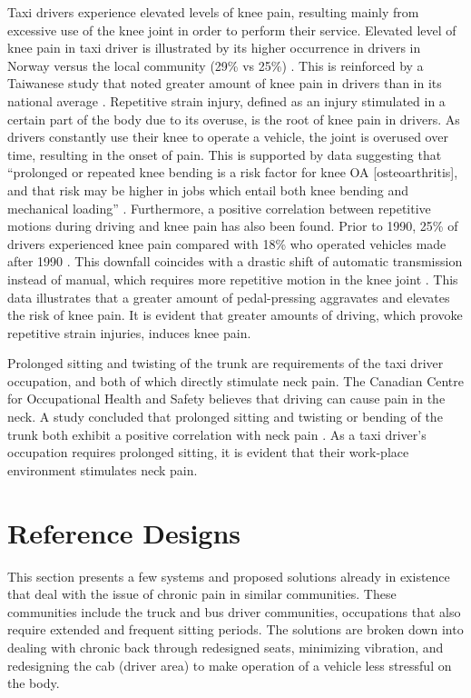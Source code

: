 \documentclass[11pt]{article}
\begin{document}
Taxi drivers experience elevated levels of knee pain, resulting mainly
from excessive use of the knee joint in order to perform their
service. Elevated level of knee pain in taxi driver is illustrated by
its higher occurrence in drivers in Norway versus the local community
(29\% vs 25\%) \cite{KneePain}. This is reinforced by a Taiwanese
study that noted greater amount of knee pain in drivers than in its
national average \cite{KneePain}. Repetitive strain injury, defined as
an injury stimulated in a certain part of the body due to its overuse,
is the root of knee pain in drivers\cite{RSI}. As drivers constantly
use their knee to operate a vehicle, the joint is overused over time,
resulting in the onset of pain. This is supported by data suggesting
that “prolonged or repeated knee bending is a risk factor for knee OA
[osteoarthritis], and that risk may be higher in jobs which entail
both knee bending and mechanical loading”
\cite{Osteoarthritis}. Furthermore, a positive correlation between
repetitive motions during driving and knee pain has also been
found. Prior to 1990, 25\% of drivers experienced knee pain compared
with 18\% who operated vehicles made after 1990 \cite{KneePain}. This
downfall coincides with a drastic shift of automatic transmission
instead of manual, which requires more repetitive motion in the knee
joint \cite{KneePain}. This data illustrates that a greater amount of
pedal-pressing aggravates and elevates the risk of knee pain. It is
evident that greater amounts of driving, which provoke repetitive
strain injuries, induces knee pain.
 
Prolonged sitting and twisting of the trunk are requirements of the
taxi driver occupation, and both of which directly stimulate neck
pain. The Canadian Centre for Occupational Health and Safety believes
that driving can cause pain in the neck\cite{proof}. A study concluded
that prolonged sitting and twisting or bending of the trunk both
exhibit a positive correlation with neck pain \cite{neck}. As a taxi
driver’s occupation requires prolonged sitting, it is evident that
their work-place environment stimulates neck pain.
\section{Reference Designs}
\label{sec:designs}

This section presents a few systems and proposed solutions already in existence that deal with the issue of
chronic pain in similar communities. These communities include the truck and bus driver communities, occupations 
that also require extended and frequent sitting periods. The solutions are broken down into dealing with chronic back 
through redesigned seats, minimizing vibration, and redesigning the cab (driver area) to make operation of a vehicle
less stressful on the body.
\end{document}
